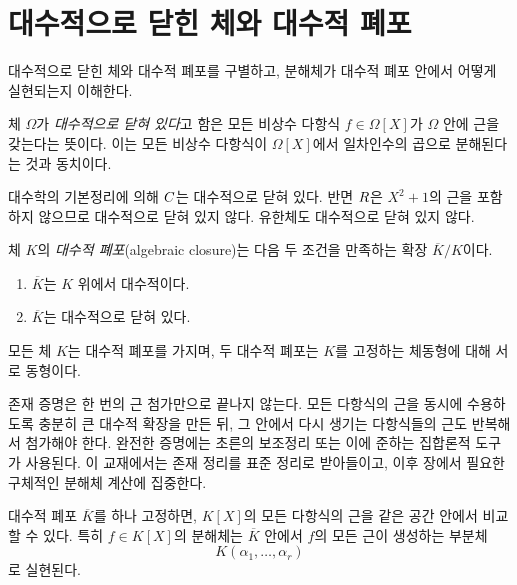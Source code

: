 \section{대수적으로 닫힌 체와 대수적 폐포}
\label{sec:algebraic-closure}

\begin{learninggoal}
대수적으로 닫힌 체와 대수적 폐포를 구별하고, 분해체가 대수적 폐포 안에서 어떻게 실현되는지 이해한다.
\end{learninggoal}

\begin{definition}[대수적으로 닫힌 체]
체 $\Omega$가 \emph{대수적으로 닫혀 있다}고 함은 모든 비상수 다항식 $f\in\Omega[X]$가 $\Omega$ 안에 근을 갖는다는 뜻이다. 이는 모든 비상수 다항식이 $\Omega[X]$에서 일차인수의 곱으로 분해된다는 것과 동치이다.
\end{definition}

\begin{example}
대수학의 기본정리에 의해 $C$는 대수적으로 닫혀 있다. 반면 $R$은 $X^2+1$의 근을 포함하지 않으므로 대수적으로 닫혀 있지 않다. 유한체도 대수적으로 닫혀 있지 않다.
\end{example}

\begin{definition}[대수적 폐포]
체 $K$의 \emph{대수적 폐포}(algebraic closure)는 다음 두 조건을 만족하는 확장 $\overline K/K$이다.
\begin{enumerate}[label=(\roman*)]
  \item $\overline K$는 $K$ 위에서 대수적이다.
  \item $\overline K$는 대수적으로 닫혀 있다.
\end{enumerate}
\end{definition}

\begin{theorem}
모든 체 $K$는 대수적 폐포를 가지며, 두 대수적 폐포는 $K$를 고정하는 체동형에 대해 서로 동형이다.
\end{theorem}

\begin{remark}
존재 증명은 한 번의 근 첨가만으로 끝나지 않는다. 모든 다항식의 근을 동시에 수용하도록 충분히 큰 대수적 확장을 만든 뒤, 그 안에서 다시 생기는 다항식들의 근도 반복해서 첨가해야 한다. 완전한 증명에는 초른의 보조정리 또는 이에 준하는 집합론적 도구가 사용된다. 이 교재에서는 존재 정리를 표준 정리로 받아들이고, 이후 장에서 필요한 구체적인 분해체 계산에 집중한다.
\end{remark}

대수적 폐포 $\overline K$를 하나 고정하면, $K[X]$의 모든 다항식의 근을 같은 공간 안에서 비교할 수 있다. 특히 $f\in K[X]$의 분해체는 $\overline K$ 안에서 $f$의 모든 근이 생성하는 부분체
\[
  K(\alpha_1,\dots,\alpha_r)
\]
로 실현된다.

